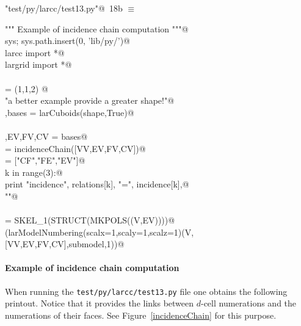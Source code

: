 \documentclass[11pt,oneside]{article}	%
\begin{document}
\begin{flushleft} \small \label{scrap32}
\protect{}\verb@"test/py/larcc/test13.py"@\nobreak\ {\footnotesize 18b }$\equiv$
\vspace{-1ex}
\begin{list}{}{} \item
\mbox{}\verb@""" Example of incidence chain computation """@\\
\mbox{}\verb@import sys; sys.path.insert(0, 'lib/py/')@\\
\mbox{}\verb@from larcc import *@\\
\mbox{}\verb@from largrid import *@\\
\mbox{}\verb@@\\
\mbox{}\verb@shape = (1,1,2) @\\
\mbox{}\verb@print "\n\nFor a better example provide a greater shape!"@\\
\mbox{}\verb@V,bases = larCuboids(shape,True)@\\
\mbox{}\verb@@\\
\mbox{}\verb@VV,EV,FV,CV = bases@\\
\mbox{}\verb@incidence = incidenceChain([VV,EV,FV,CV])@\\
\mbox{}\verb@relations = ["CF","FE","EV"]@\\
\mbox{}\verb@for k in range(3):@\\
\mbox{}\verb@   print "\n\n incidence", relations[k], "=\n", incidence[k],@\\
\mbox{}\verb@print "\n\n"@\\
\mbox{}\verb@@\\
\mbox{}\verb@submodel = SKEL_1(STRUCT(MKPOLS((V,EV))))@\\
\mbox{}\verb@VIEW(larModelNumbering(scalx=1,scaly=1,scalz=1)(V,[VV,EV,FV,CV],submodel,1))@\\
\mbox{}\verb@@{\NWsep}
\end{list}
\vspace{-2ex}
\end{flushleft}


\paragraph{Example of incidence chain computation}
When running the \texttt{test/py/larcc/test13.py} file one obtains the following printout. 
Notice that 
it provides the links between $d$-cell numerations and the numerations of their faces.
See Figure~\ref{incidenceChain} for this purpose.
\end{document}
